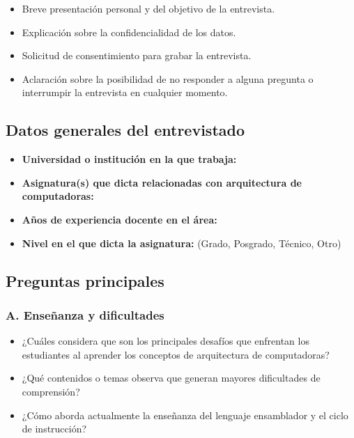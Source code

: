 \documentclass[12pt,oneside]{templates/unerthesis}
\providecommand{\tightlist}{%
  \setlength{\itemsep}{0pt}\setlength{\parskip}{0pt}}
\begin{document}
\begin{itemize}
\tightlist
\item
  Breve presentación personal y del objetivo de la entrevista.
\item
  Explicación sobre la confidencialidad de los datos.
\item
  Solicitud de consentimiento para grabar la entrevista.
\item
  Aclaración sobre la posibilidad de no responder a alguna pregunta o interrumpir la entrevista en cualquier momento.
\end{itemize}

\hypertarget{datos-generales-del-entrevistado}{%
\subsection{Datos generales del entrevistado}\label{datos-generales-del-entrevistado}}

\begin{itemize}
\tightlist
\item
  \textbf{Universidad o institución en la que trabaja:}
\item
  \textbf{Asignatura(s) que dicta relacionadas con arquitectura de computadoras:}
\item
  \textbf{Años de experiencia docente en el área:}
\item
  \textbf{Nivel en el que dicta la asignatura:} (Grado, Posgrado, Técnico, Otro)
\end{itemize}

\hypertarget{preguntas-principales}{%
\subsection{Preguntas principales}\label{preguntas-principales}}

\hypertarget{a.-enseuxf1anza-y-dificultades}{%
\subsubsection{A. Enseñanza y dificultades}\label{a.-enseuxf1anza-y-dificultades}}

\begin{itemize}
\tightlist
\item
  ¿Cuáles considera que son los principales desafíos que enfrentan los estudiantes al aprender los conceptos de arquitectura de computadoras?
\item
  ¿Qué contenidos o temas observa que generan mayores dificultades de comprensión?
\item
  ¿Cómo aborda actualmente la enseñanza del lenguaje ensamblador y el ciclo de instrucción?
\end{itemize}
\end{document}
